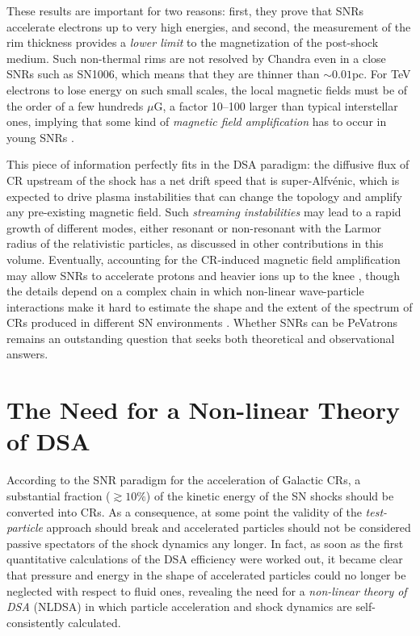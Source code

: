 \documentclass[varenna]{cimento}
\begin{document}
These results are important for two reasons: first, they prove that SNRs accelerate electrons up to very high energies, and second, the measurement of the rim thickness provides a \emph{lower limit} to the magnetization of the post-shock medium.
Such non-thermal rims are not resolved by Chandra even in a close SNRs such as SN1006, which means that they are thinner than $\sim 0.01$pc.
For TeV electrons to lose energy on such small scales, the local magnetic fields must be of the order of a few hundreds $\mu$G, a factor 10--100 larger than typical interstellar ones, implying that some kind of \emph{magnetic field amplification} has to occur in young SNRs \cite{bamba+05,volk+05,parizot+06,caprioli+09a}.

This piece of information perfectly fits in the DSA paradigm: the diffusive flux of CR upstream of the shock has a net drift speed that is super-Alfv\'enic, which is expected to drive plasma instabilities that can change the topology and amplify any pre-existing magnetic field.
Such \emph{streaming instabilities} may lead to a rapid growth of different modes, either resonant \cite{kulsrud+68,skilling75a,bell78a} or non-resonant \cite{bell04,amato+09} with the Larmor radius of the relativistic particles, as discussed in other contributions in this volume.
Eventually, accounting for the CR-induced magnetic field amplification may allow SNRs to accelerate protons and heavier ions up to the knee \cite{blasi+07}, though the details depend on a complex chain in which non-linear wave-particle interactions make it hard to estimate the shape and the extent of the spectrum of CRs produced in different SN environments \cite{bell+13,cardillo+15, cristofari+21,cristofari+22}. 
Whether SNRs can be PeVatrons remains an outstanding question that seeks both theoretical and observational answers.


\section{The Need for a Non-linear Theory of DSA}\label{sec:challenges}
According to the SNR paradigm for the acceleration of Galactic CRs, a substantial fraction ($\gtrsim 10\%$) of the kinetic energy of the SN shocks should be converted into CRs.
As a consequence, at some point the validity of the \emph{test-particle} approach should break and  accelerated particles should not be considered passive spectators of the shock dynamics any longer.
In fact, as soon as the first quantitative calculations of the DSA efficiency were worked out, it became clear that pressure and energy in the shape of accelerated particles could no longer be neglected with respect to fluid ones, revealing the need for a \emph{non-linear theory of DSA} (NLDSA) in which particle acceleration and shock dynamics are self-consistently calculated.
\end{document}
